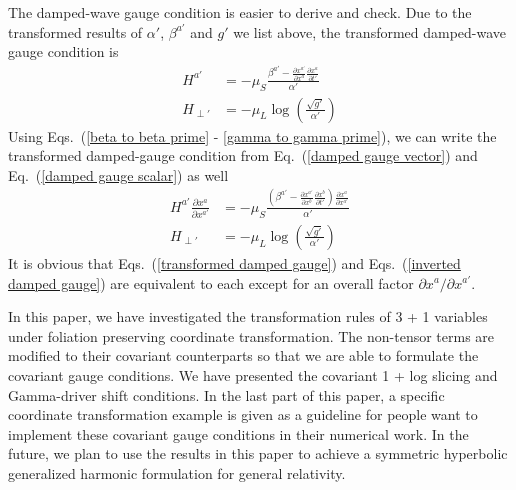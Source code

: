 The damped-wave gauge condition is easier to derive and check. Due to the transformed results of $\alpha'$, $\beta^{a'}$ and $g'$ we list above, the transformed damped-wave gauge condition is
\begin{subequations}\label{transformed damped gauge}
\begin{align}
H^{a'} & = -\mu_{S}\frac{\beta^{a'} - \frac{\partial x^{a'}}{\partial x^{a}}\frac{\partial x^{a}}{\partial t'}}{\alpha'}\\
H_{\perp'} & = -\mu_{L}\log\left(\frac{\sqrt{g'}}{\alpha'}\right)
\end{align}
\end{subequations}
Using Eqs.~(\ref{beta to beta prime} - \ref{gamma to gamma prime}), we can write the transformed damped-gauge condition from Eq.~(\ref{damped gauge vector}) and Eq.~(\ref{damped gauge scalar}) as well
\begin{subequations}\label{inverted damped gauge}
\begin{align}
H^{a'}\frac{\partial x^{a}}{\partial x^{a'}} & = - \mu_{S}\frac{\left( \beta^{a'} - \frac{\partial x^{a'}}{\partial x^{b}}\frac{\partial x^{b}}{\partial t'}\right)\frac{\partial x^{a}}{\partial x^{a'}}}{\alpha'}\\
H_{\perp'} & = - \mu_{L}\log\left(\frac{\sqrt{g'}}{\alpha'}\right)
\end{align}
\end{subequations}
It is obvious that Eqs.~(\ref{transformed damped gauge}) and Eqs.~(\ref{inverted damped gauge}) are equivalent to each except for an overall factor $\partial x^{a}/\partial x^{a'}$. 

In this paper, we have investigated the transformation rules of 3 + 1 variables under foliation preserving coordinate transformation. The non-tensor terms are modified to their covariant counterparts so that we are able to formulate the covariant gauge conditions. We have presented the covariant 1 + log slicing and Gamma-driver shift conditions. In the last part of this paper, a specific coordinate transformation example is given as a guideline for people want to implement these covariant gauge conditions in their numerical work. In the future, we plan to use the results in this paper to achieve a symmetric hyperbolic generalized harmonic formulation for general relativity.  

